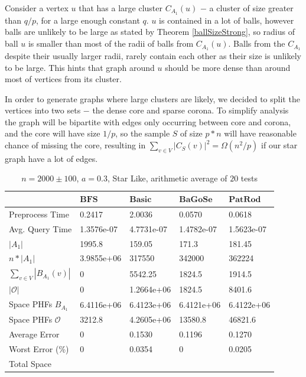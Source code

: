\documentclass[shortabstract, lic, english]{iithesis}
\theoremstyle{definition} \newtheorem{definition}{Definition}[chapter]
\theoremstyle{remark} \newtheorem{remark}[definition]{Observation}
\theoremstyle{plain} \newtheorem{theorem}[definition]{Theorem}
\theoremstyle{plain} \newtheorem{lemma}[definition]{Lemma}
\theoremstyle{plain} \newtheorem{conjecture}[definition]{Conjecture}
\begin{document}
Consider a vertex $u$ that has a large cluster $C_{A_1}(u)$ $-$ a cluster of size greater than $q/p$, for a large enough constant $q$.
$u$ is contained in a lot of balls, however balls are unlikely to be large as stated by Theorem \ref{ballSizeStrong},
so radius of ball $u$ is smaller than most of the radii of balls from $C_{A_1}(u)$. Balls from the $C_{A_1}$ despite their usually larger radii,
rarely contain each other as their size is unlikely to be large. This hints that graph around $u$ should be more dense than around most of vertices from its cluster.

In order to generate graphs where large clusters are likely, we decided to split the vertices into two sets $-$ the dense core and sparse corona.
To simplify analysis the graph will be bipartite with edges only occurring between core and corona,
and the core will have size $1/p$, so the sample $S$ of size $p * n$ will have reasonable chance of missing the core,
resulting in $\sum_{v \in V}|C_S(v)|^2 = \Omega(n^2/p)$ if our star graph have a lot of edges.

\begin{table}[H]
    \centering
    \begin{tabular}{ |p{3cm}||p{2cm}|p{2cm}|p{2cm}|p{2cm}|  } 
        \hline
        & $\mathbf{BFS}$ & $\mathbf{Basic}$ & $\mathbf{BaGoSe}$ & $\mathbf{PatRod}$ \\
        \hline
        \hline
        Preprocess Time                 & 0.2417     & 2.0036     & 0.0570      & 0.0618     \\
        \hline
        Avg. Query Time                 & 1.3576e-07 & 4.7731e-07 & 1.4782e-07  & 1.5623e-07 \\
        \hline
        $|A_1|$                         & 1995.8     & 159.05     & 171.3       & 181.45      \\
        \hline
        $n * |A_1|$                     & 3.9855e+06 & 317550     & 342000      & 362224     \\
        \hline
        $\sum_{v \in V} |B_{A_1}(v)| $  & 0          & 5542.25    & 1824.5      & 1914.5     \\
        \hline
        $|\mathcal{O}|$                 & 0          & 1.2664e+06 & 1824.5      & 8401.6     \\
        \hline
        Space PHFs $B_{A_1}$            & 6.4116e+06 & 6.4123e+06 & 6.4121e+06  & 6.4122e+06 \\
        \hline
        Space PHFs $\mathcal{O}$        & 3212.8     & 4.2605e+06 & 13580.8     & 46821.6     \\
        \hline
        Average Error                   & 0          & 0.1530     & 0.1196      & 0.1270     \\
        \hline
        Worst Error (\%)                & 0          & 0.0354     & 0           & 0.0205     \\
        \hline
        Total Space                     &            &            &             &            \\
        \hline

    \end{tabular}
    \caption{$n = 2000 \pm 100$, $a = 0.3$, Star Like, arithmetic average of $20$ tests}
\end{table}
\end{document}
